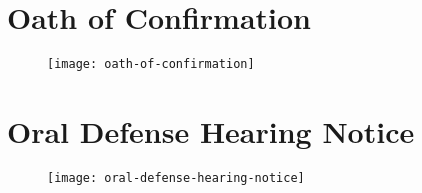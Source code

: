 \chapter{Oath of Confirmation}
\begin{figure}[H]
\texttt{[image: oath-of-confirmation]}
\centering
\end{figure}

\chapter{Oral Defense Hearing Notice}
\begin{figure}[H]
\texttt{[image: oral-defense-hearing-notice]}
\centering
\end{figure}